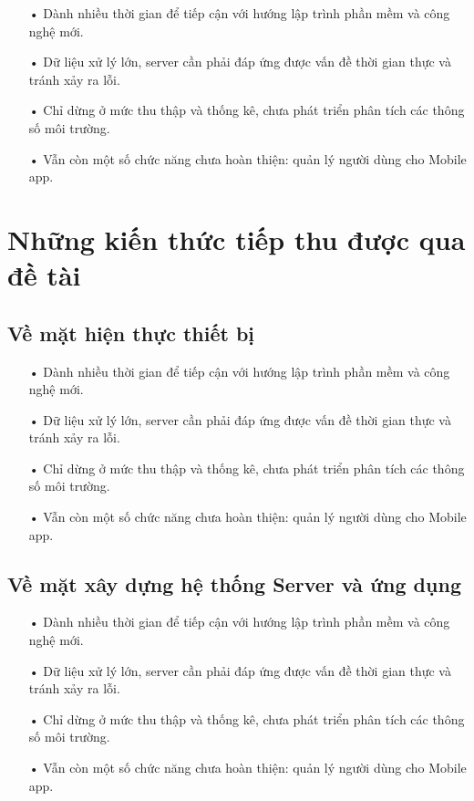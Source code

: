 \begin{itemize}
\item[•] Dành nhiều thời gian để tiếp cận với hướng lập trình phần mềm và công nghệ mới.
\item[•] Dữ liệu xử lý lớn, server cần phải đáp ứng được vấn đề thời gian thực và tránh xảy ra lỗi.
\item[•] Chỉ dừng ở mức thu thập và thống kê, chưa phát triển phân tích các thông số môi trường.
\item[•] Vẫn còn một số chức năng chưa hoàn thiện: quản lý người dùng cho Mobile app.
\end{itemize}
\section{Những kiến thức tiếp thu được qua đề tài}
\subsection{Về mặt hiện thực thiết bị}
\begin{itemize}
	\item[•] Dành nhiều thời gian để tiếp cận với hướng lập trình phần mềm và công nghệ mới.
	\item[•] Dữ liệu xử lý lớn, server cần phải đáp ứng được vấn đề thời gian thực và tránh xảy ra lỗi.
	\item[•] Chỉ dừng ở mức thu thập và thống kê, chưa phát triển phân tích các thông số môi trường.
	\item[•] Vẫn còn một số chức năng chưa hoàn thiện: quản lý người dùng cho Mobile app.
\end{itemize}
\subsection{Về mặt xây dựng hệ thống Server và ứng dụng}
\begin{itemize}
	\item[•] Dành nhiều thời gian để tiếp cận với hướng lập trình phần mềm và công nghệ mới.
	\item[•] Dữ liệu xử lý lớn, server cần phải đáp ứng được vấn đề thời gian thực và tránh xảy ra lỗi.
	\item[•] Chỉ dừng ở mức thu thập và thống kê, chưa phát triển phân tích các thông số môi trường.
	\item[•] Vẫn còn một số chức năng chưa hoàn thiện: quản lý người dùng cho Mobile app.
\end{itemize}
